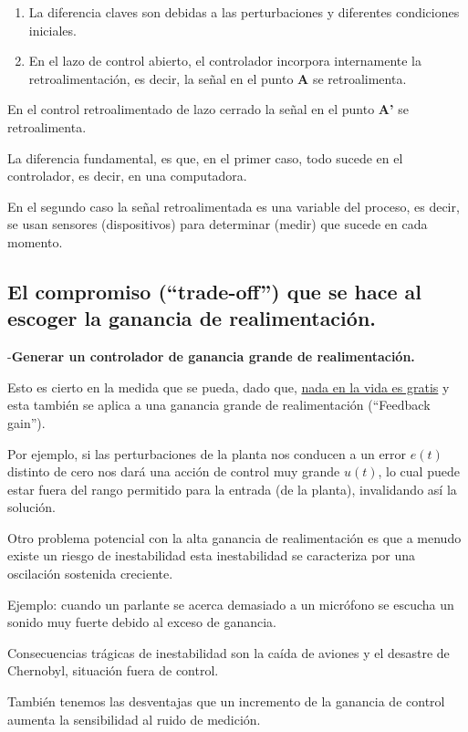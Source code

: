 \documentclass[a4paper]{article}
\begin{document}
\begin{enumerate}
		\item La diferencia claves son debidas a las perturbaciones y diferentes condiciones iniciales.
		\item En el lazo de control abierto, el controlador incorpora internamente la retroalimentación, es decir, la señal en el punto \textbf{A} se retroalimenta.
\end{enumerate}

En el control retroalimentado  de lazo cerrado la señal en el punto \textbf{A'} se retroalimenta.

La diferencia fundamental, es que, en el primer caso, todo sucede en el controlador, es decir, en una computadora.

En el segundo caso la señal retroalimentada es una variable del proceso, es decir, se usan sensores (dispositivos) para determinar (medir) que sucede en cada momento.

\subsection{El compromiso (``trade-off'') que se hace al escoger la ganancia de realimentación.}

-\textbf{Generar un controlador de ganancia grande de realimentación.}

Esto es cierto en la medida que se pueda, dado que, \underline{nada en la vida es gratis} y esta también se aplica a una ganancia grande de realimentación (``Feedback gain'').

Por ejemplo, si las perturbaciones de la planta nos conducen a un error $e(t)$ distinto de cero nos dará una acción de control muy grande $u(t)$, lo cual puede estar fuera del rango permitido para la entrada (de la planta), invalidando así la solución.

Otro problema potencial con la alta ganancia de realimentación es que a menudo existe un riesgo de inestabilidad esta inestabilidad se caracteriza por una oscilación sostenida creciente.

Ejemplo: cuando un parlante se acerca demasiado a un micrófono se escucha un sonido muy fuerte debido al exceso de ganancia.

Consecuencias trágicas de inestabilidad son la caída de aviones y el desastre de Chernobyl, situación fuera de control.

También tenemos las desventajas que un incremento de la ganancia de control aumenta la sensibilidad al ruido de medición.
\end{document}
